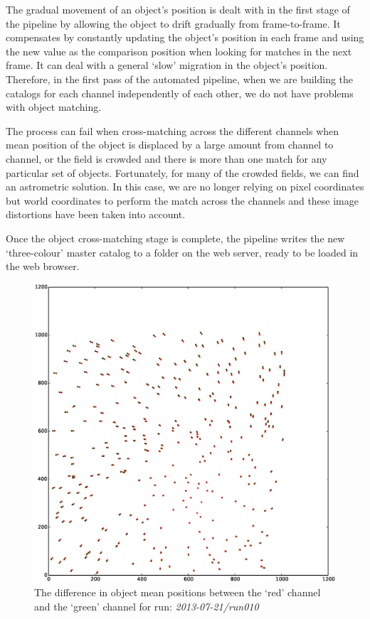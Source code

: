 The gradual movement of an object's position is dealt with in the first stage of the pipeline by allowing the object to drift gradually from frame-to-frame. It compensates by constantly updating the object's position in each frame and using the new value as the comparison position when looking for matches in the next frame. It can deal with a general `slow' migration in the object's position. Therefore, in the first pass of the automated pipeline, when we are building the catalogs for each channel independently of each other, we do not have problems with object matching. 

The process can fail when cross-matching across the different channels when mean position of the object is displaced by a large amount from channel to channel, or the field is crowded and there is more than one match for any particular set of objects. Fortunately, for many of the crowded fields, we can find an astrometric solution. In this case, we are no longer relying on pixel coordinates but world coordinates to perform the match across the channels and these image distortions have been taken into account. 

Once the object cross-matching stage is complete, the pipeline writes the new `three-colour' master catalog to a folder on the web server, ready to be loaded in the web browser. 

\begin{figure}
  \centering
  \includegraphics[width=\textwidth]{images/objectOffset_run010_g.eps}
  \caption{The difference in object mean positions between the `red' channel and the `green' channel for run: \emph{2013-07-21/run010} }
\label{fig:redgreenoffset}
\end{figure}


